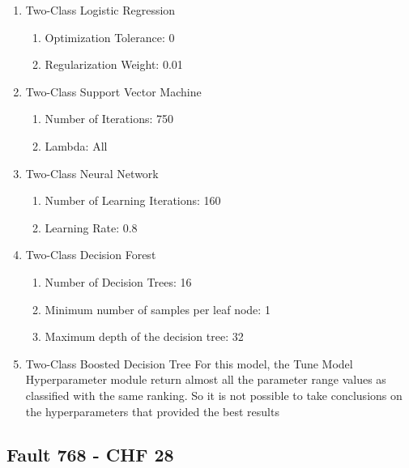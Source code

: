 \begin{enumerate}
    \item{Two-Class Logistic Regression}
    
    \begin{enumerate}
        \item{Optimization Tolerance:} 0
        \item{Regularization Weight:} 0.01
    \end{enumerate}
    
    \item{Two-Class Support Vector Machine}
    
    \begin{enumerate}
        \item{Number of Iterations:} 750
        \item{Lambda:} All
    \end{enumerate}
    
    \item{Two-Class Neural Network}
    
    \begin{enumerate}
        \item{Number of Learning Iterations:} 160
        \item{Learning Rate:} 0.8
    \end{enumerate}
    
    \item{Two-Class Decision Forest}

    \begin{enumerate}
        \item{Number of Decision Trees:} 16
        \item{Minimum number of samples per leaf node:} 1
        \item{Maximum depth of the decision tree:} 32
    \end{enumerate}
    
    \item{Two-Class Boosted Decision Tree}
    For this model, the Tune Model Hyperparameter module return almost all the parameter range values as classified with the same ranking. So it is not possible to take conclusions on the hyperparameters that provided the best results
    
\end{enumerate}


\subsection{Fault 768 - CHF 28}


